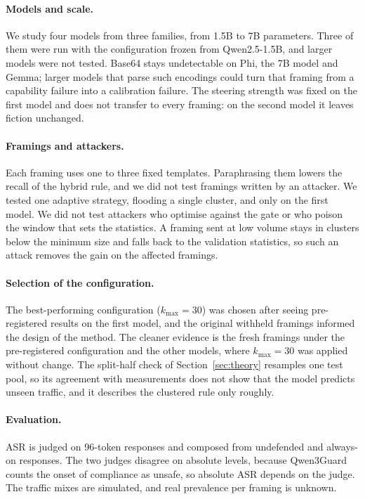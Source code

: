\documentclass[11pt]{article}
\begin{document}
\paragraph{Models and scale.}
We study four models from three families, from 1.5B to 7B parameters. Three of them were run with the configuration frozen from Qwen2.5-1.5B, and larger models were not tested. Base64 stays undetectable on Phi, the 7B model and Gemma; larger models that parse such encodings could turn that framing from a capability failure into a calibration failure. The steering strength was fixed on the first model and does not transfer to every framing: on the second model it leaves fiction unchanged.

\paragraph{Framings and attackers.}
Each framing uses one to three fixed templates. Paraphrasing them lowers the recall of the hybrid rule, and we did not test framings written by an attacker. We tested one adaptive strategy, flooding a single cluster, and only on the first model. We did not test attackers who optimise against the gate \citep{bailey2026obfuscated} or who poison the window that sets the statistics. A framing sent at low volume stays in clusters below the minimum size and falls back to the validation statistics, so such an attack removes the gain on the affected framings.

\paragraph{Selection of the configuration.}
The best-performing configuration ($k_{\max}{=}30$) was chosen after seeing pre-registered results on the first model, and the original withheld framings informed the design of the method. The cleaner evidence is the fresh framings under the pre-registered configuration and the other models, where $k_{\max}{=}30$ was applied without change. The split-half check of Section~\ref{sec:theory} resamples one test pool, so its agreement with measurements does not show that the model predicts unseen traffic, and it describes the clustered rule only roughly.

\paragraph{Evaluation.}
ASR is judged on 96-token responses and composed from undefended and always-on responses. The two judges disagree on absolute levels, because Qwen3Guard counts the onset of compliance as unsafe, so absolute ASR depends on the judge. The traffic mixes are simulated, and real prevalence per framing is unknown.
\end{document}
